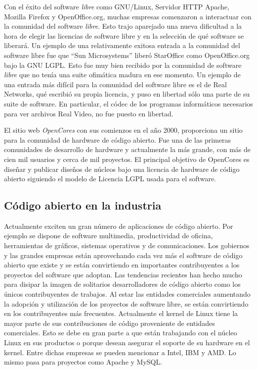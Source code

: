 Con el éxito del software \textit{libre} como GNU/Linux, Servidor HTTP
Apache, Mozilla Firefox y OpenOffice.org, muchas empresas
comenzaron a interactuar con la comunidad del software
\textit{libre}. Esto trajo aparejado una nueva dificultad a la hora de
elegir las licencias de software libre y en la selección de qué
software se liberará. Un ejemplo de una relativamente exitosa entrada
a la comunidad del software libre fue que ``Sun Microsystems'' liberó
StarOffice como OpenOffice.org bajo la GNU LGPL. Esto fue muy bien
recibido por la comunidad de software \textit{libre} que no tenía una
suite ofimática madura en ese momento. Un ejemplo de una entrada más
difícil para la comunidad del software libre es el de Real Networks,
qué escribió su propia licencia, y puso en libertad sólo una parte de
su suite de software. En particular, el códec de los programas
informáticos necesarios para ver archivos Real Video, no fue puesto en
libertad.

El sitio web \textit{OpenCores} con sus comienzos en el año 2000,
proporciona un sitio para la comunidad de hardware de código abierto.
Fue una de las primeras comunidades de desarrollo de hardware y
actualmente la más grande, con más de cien mil usuarios y cerca de mil
proyectos. El principal objetivo de OpenCores es diseñar y publicar
diseños de núcleos bajo una licencia de hardware de código abierto
siguiendo el modelo de Licencia LGPL usada para el software.

\subsection{Código abierto en la industria}

Actualmente exciten un gran número de aplicaciones de código
abierto. Por ejemplo se dispone de software multimedia, productividad
de oficina, herramientas de gráficos, sistemas operativos y de
comunicaciones. Los gobiernos y las grandes empresas están
aprovechando cada vez más el software de código abierto que existe y
se están convirtiendo en importantes contribuyentes a los proyectos
del software que adoptan. Las tendencias recientes han hecho mucho
para disipar la imagen de solitarios desarrolladores de código abierto
como los únicos contribuyentes de trabajos. Al estar las entidades
comerciales aumentando la adopción y utilización de los proyectos de
software libre, se están convirtiendo en los contribuyentes más
frecuentes. Actualmente el kernel de Linux tiene la mayor parte de sus
contribuciones de código proveniente de entidades comerciales. Esto se
debe en gran parte a que están trabajando con el núcleo Linux en sus
productos o porque desean asegurar el soporte de su hardware en el
kernel. Entre dichas empresas se pueden mencionar a Intel, IBM y
AMD. Lo mismo pasa para proyectos como Apache y MySQL.


